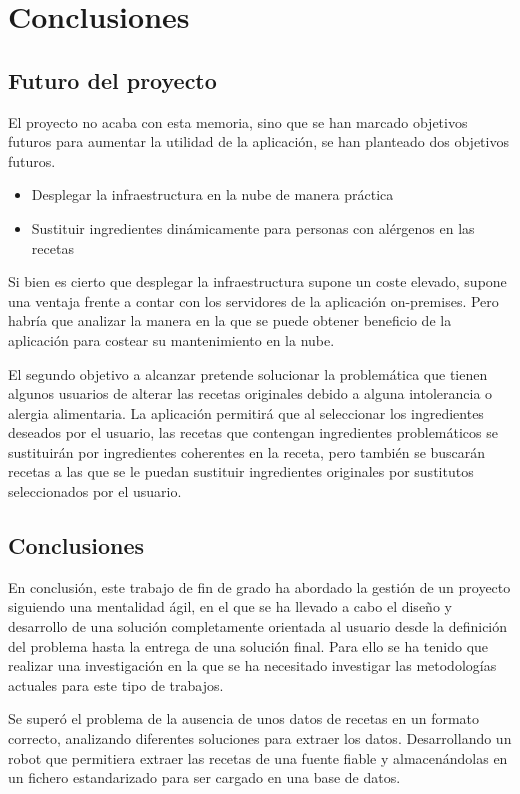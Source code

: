 \chapter{Conclusiones}

\section{Futuro del proyecto}
El proyecto no acaba con esta memoria, sino que se han marcado objetivos futuros para aumentar la utilidad de la aplicación, se han planteado dos objetivos futuros.
\begin{itemize}
    \item Desplegar la infraestructura en la nube de manera práctica
    \item Sustituir ingredientes dinámicamente para personas con alérgenos en las recetas
\end{itemize}

Si bien es cierto que desplegar la infraestructura supone un coste elevado, supone una ventaja frente a contar con los servidores de la aplicación \gls{on-premises}. Pero habría que analizar la manera en la que se puede obtener beneficio de la aplicación para costear su mantenimiento en la nube.

El segundo objetivo a alcanzar pretende solucionar la problemática que tienen algunos usuarios de alterar las recetas originales debido a alguna intolerancia o alergia alimentaria. La aplicación permitirá que al seleccionar los ingredientes deseados por el usuario, las recetas que contengan ingredientes problemáticos se sustituirán por ingredientes coherentes en la receta, pero también se buscarán recetas a las que se le puedan sustituir ingredientes originales por sustitutos seleccionados por el usuario.

\section{Conclusiones}
En conclusión, este trabajo de fin de grado ha abordado la gestión de un proyecto siguiendo una mentalidad ágil, en el que se ha llevado a cabo el diseño y desarrollo de una solución completamente orientada al usuario desde la definición del problema hasta la entrega de una solución final. Para ello se ha tenido que realizar una investigación en la que se ha necesitado investigar las metodologías actuales para este tipo de trabajos. 

Se superó el problema de la ausencia de unos datos de recetas en un formato correcto, analizando diferentes soluciones para extraer los datos. Desarrollando un robot que permitiera extraer las recetas de una fuente fiable y almacenándolas en un fichero estandarizado para ser cargado en una base de datos.

